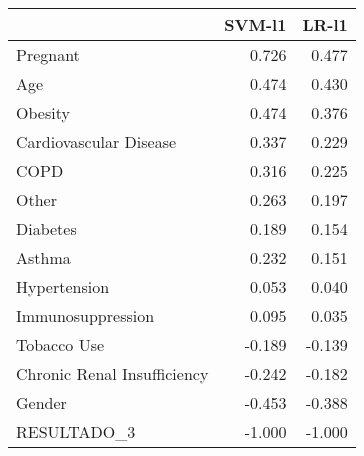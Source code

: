 \begin{tabular}{lrr}
\toprule
{} &  SVM-l1 &  LR-l1 \\
\midrule
Pregnant                    &   0.726 &  0.477 \\
Age                         &   0.474 &  0.430 \\
Obesity                     &   0.474 &  0.376 \\
Cardiovascular Disease      &   0.337 &  0.229 \\
COPD                        &   0.316 &  0.225 \\
Other                       &   0.263 &  0.197 \\
Diabetes                    &   0.189 &  0.154 \\
Asthma                      &   0.232 &  0.151 \\
Hypertension                &   0.053 &  0.040 \\
Immunosuppression           &   0.095 &  0.035 \\
Tobacco Use                 &  -0.189 & -0.139 \\
Chronic Renal Insufficiency &  -0.242 & -0.182 \\
Gender                      &  -0.453 & -0.388 \\
RESULTADO\_3                 &  -1.000 & -1.000 \\
\bottomrule
\end{tabular}
